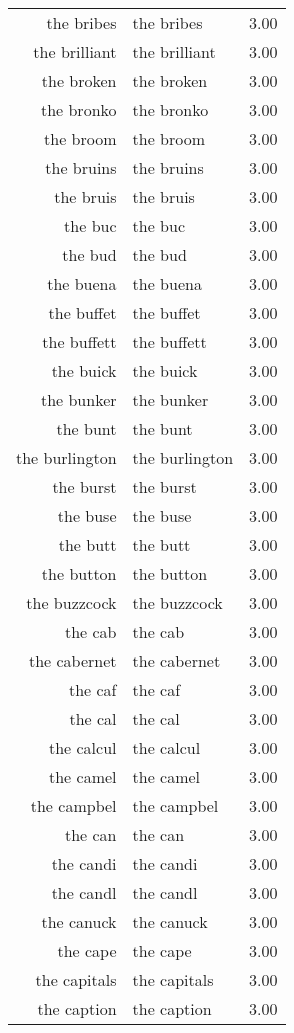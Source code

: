 \begin{table}[ht]
\begin{tabular}{rlr}
  the bribes & the bribes & 3.00 \\ 
  the brilliant & the brilliant & 3.00 \\ 
  the broken & the broken & 3.00 \\ 
  the bronko & the bronko & 3.00 \\ 
  the broom & the broom & 3.00 \\ 
  the bruins & the bruins & 3.00 \\ 
  the bruis & the bruis & 3.00 \\ 
  the buc & the buc & 3.00 \\ 
  the bud & the bud & 3.00 \\ 
  the buena & the buena & 3.00 \\ 
  the buffet & the buffet & 3.00 \\ 
  the buffett & the buffett & 3.00 \\ 
  the buick & the buick & 3.00 \\ 
  the bunker & the bunker & 3.00 \\ 
  the bunt & the bunt & 3.00 \\ 
  the burlington & the burlington & 3.00 \\ 
  the burst & the burst & 3.00 \\ 
  the buse & the buse & 3.00 \\ 
  the butt & the butt & 3.00 \\ 
  the button & the button & 3.00 \\ 
  the buzzcock & the buzzcock & 3.00 \\ 
  the cab & the cab & 3.00 \\ 
  the cabernet & the cabernet & 3.00 \\ 
  the caf & the caf & 3.00 \\ 
  the cal & the cal & 3.00 \\ 
  the calcul & the calcul & 3.00 \\ 
  the camel & the camel & 3.00 \\ 
  the campbel & the campbel & 3.00 \\ 
  the can & the can & 3.00 \\ 
  the candi & the candi & 3.00 \\ 
  the candl & the candl & 3.00 \\ 
  the canuck & the canuck & 3.00 \\ 
  the cape & the cape & 3.00 \\ 
  the capitals & the capitals & 3.00 \\ 
  the caption & the caption & 3.00 \\ 

\end{tabular}
\end{table}
